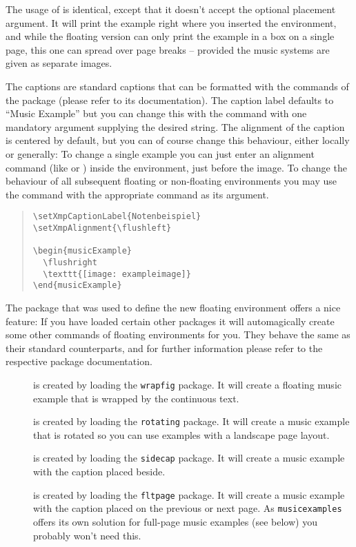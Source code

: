 \documentclass[../openLilyLib]{subfiles}
\begin{document}
The usage of  is identical, except that it doesn't accept the optional placement argument.
It will print the example right where you inserted the environment, and while the floating version can only print the example in a box on a single page, this one can spread over page breaks -- provided the music systems are given as separate images.

The captions are standard captions that can be formatted with the commands of the  package (please refer to its documentation).
The caption label defaults to “Music Example” but you can change this with the command  with one mandatory argument supplying the desired string.
The alignment of the caption is centered by default, but you can of course change this behaviour, either locally or generally:
To change a single example you can just enter an alignment command (like  or ) inside the environment, just before the image.
To change the behaviour of all subsequent floating or non-floating environments you may use the  command with the appropriate command as its argument.

\begin{quote}
\begin{verbatim}
\setXmpCaptionLabel{Notenbeispiel}
\setXmpAlignment{\flushleft}

\begin{musicExample}
  \flushright
  \texttt{[image: exampleimage]}
\end{musicExample}
\end{verbatim}
\end{quote}

The  package that was used to define the new floating environment offers a nice feature:
If you have loaded certain other packages it will automagically create some other commands of floating environments for you.
They behave the same as their standard counterparts, and for further information please refer to the respective package documentation.

\begin{description}
\item[] is created by loading the \texttt{wrapfig} package.
It will create a floating music example that is wrapped by the continuous text.
\item[] is created by loading the \texttt{rotating} package.
It will create a music example that is rotated so you can use examples with a landscape page layout.
\item[] is created by loading the \texttt{sidecap} package.
It will create a music example with the caption placed beside.
\item[{}] is created by loading the \texttt{fltpage} package.
It will create a music example with the caption placed on the previous or next page.
As \texttt{musicexamples} offers its own solution for full-page music examples (see below) you probably won't need this.
\end{description}
\end{document}
